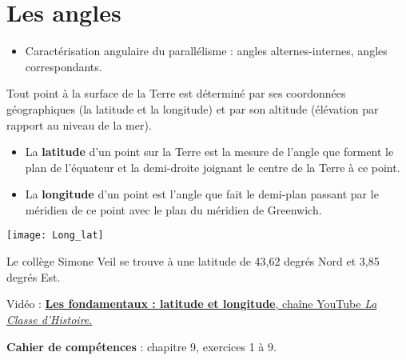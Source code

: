 \themaG
\graphicspath{{../../S02_Les_angles/Images/}}

\chapter{Les angles}
\label{S02}

\begin{prerequis}
   \begin{itemize}
      \item Caractérisation angulaire du parallélisme : angles alternes-internes, angles correspondants.
   \end{itemize}
\end{prerequis}

\vfill

\begin{debat}
   Tout point à la surface de la Terre est déterminé par ses coordonnées géographiques (la latitude et la longitude) et par son altitude (élévation par rapport au niveau de la mer).
   \begin{itemize}
      \item La {\bf latitude} d'un point sur la Terre est la mesure de l'angle que forment le plan de l'équateur et la demi-droite joignant le centre de la Terre à ce point.
      \item La {\bf longitude} d'un point est l'angle que fait le demi-plan passant par le méridien de ce point avec le plan du méridien de Greenwich.\end{itemize}
   \begin{center}
      \texttt{[image: Long\_lat]}
   \end{center} 
   Le collège Simone Veil se trouve à une latitude de 43,62 degrés Nord et 3,85 degrés Est.
  \bigskip
   \begin{cadre}[B2][F4]
      \begin{center}
         Vidéo : \href{https://www.youtube.com/watch?v=lpYEuHeecko}{{\bf Les fondamentaux : latitude et longitude}, chaîne YouTube {\it La Classe d'Histoire}.}
      \end{center}
   \end{cadre}
\end{debat}

\vfill

\textcolor{PartieGeometrie}{\sffamily\bfseries Cahier de compétences} : chapitre 9, exercices 1 à 9.


